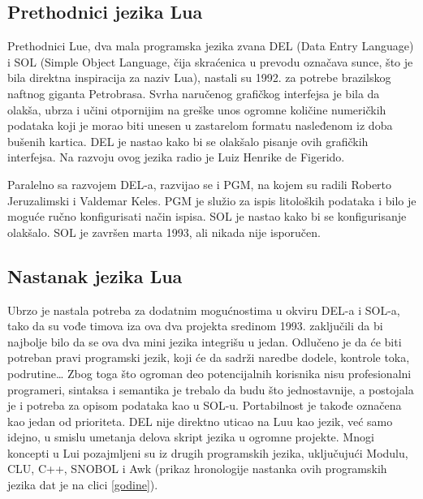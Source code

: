 \documentclass[a4paper]{article}
\begin{document}
\subsection{Prethodnici jezika Lua}


Prethodnici Lue, dva mala programska jezika zvana DEL (Data Entry Language) i SOL (Simple Object Language, čija skraćenica u prevodu označava sunce, što je bila direktna inspiracija za naziv Lua), nastali su 1992. za potrebe brazilskog naftnog giganta Petrobrasa. Svrha naručenog grafičkog interfejsa je bila da olakša, ubrza i učini otpornijim na greške unos ogromne količine numeričkih podataka koji je morao biti unesen u zastarelom formatu nasleđenom iz doba bušenih kartica. 
DEL je nastao kako bi se olakšalo pisanje ovih grafičkih interfejsa. Na razvoju ovog jezika radio je Luiz Henrike de Figerido.

Paralelno sa razvojem DEL-a, razvijao se i PGM, na kojem su radili Roberto Jeruzalimski i Valdemar Keles. PGM je služio za ispis litoloških podataka i bilo je moguće ručno konfigurisati način ispisa. SOL je nastao kako bi se konfigurisanje olakšalo. SOL je završen marta 1993, ali nikada nije isporučen.

\subsection{Nastanak jezika Lua}

Ubrzo je nastala potreba za dodatnim mogućnostima u okviru DEL-a i SOL-a, tako da su vođe timova iza ova dva projekta sredinom 1993. zaključili da bi najbolje bilo da se ova dva mini jezika integrišu u jedan. Odlučeno je da će biti potreban pravi programski jezik, koji će da sadrži naredbe dodele, kontrole toka, podrutine… Zbog toga što ogroman deo potencijalnih korisnika nisu profesionalni programeri, sintaksa i semantika je trebalo da budu što jednostavnije, a postojala je i potreba za opisom podataka kao u SOL-u. Portabilnost je takođe označena kao jedan od prioriteta. DEL nije direktno uticao na Luu kao jezik, već samo idejno, u smislu umetanja delova skript jezika u ogromne projekte. Mnogi koncepti u Lui pozajmljeni su iz drugih programskih jezika, uključujući Modulu, CLU, C++, SNOBOL i Awk (prikaz hronologije nastanka ovih programskih jezika dat je na clici \ref{godine}). %
\end{document}
